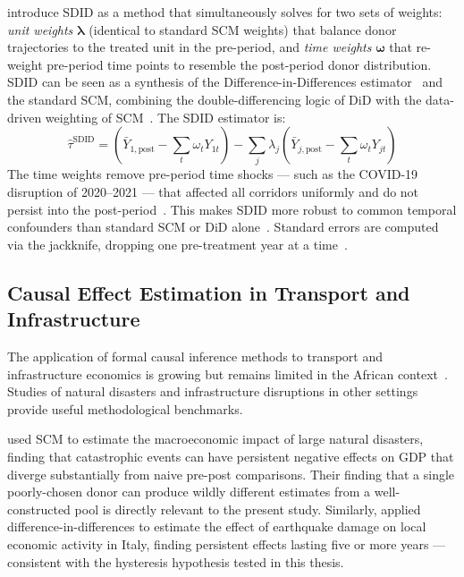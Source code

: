 \textcite{arkhangelsky2021} introduce SDID as a
method that simultaneously solves for two sets of weights:
\emph{unit weights} $\boldsymbol{\lambda}$ (identical to standard
SCM weights) that balance donor trajectories to the treated unit
in the pre-period, and \emph{time weights} $\boldsymbol{\omega}$
that re-weight pre-period time points to resemble the post-period
donor distribution.
SDID can be seen as a synthesis of the Difference-in-Differences
estimator~\parencite{card1994} and the standard SCM, combining the
double-differencing logic of DiD with the data-driven weighting of
SCM~\parencite{arkhangelsky2021}.
The SDID estimator is:
\begin{equation}
  \hat{\tau}^{\text{SDID}} =
    \left(\bar{Y}_{1,\text{post}} - \sum_t \omega_t Y_{1t}\right)
    - \sum_j \lambda_j \!\left(\bar{Y}_{j,\text{post}}
      - \sum_t \omega_t Y_{jt}\right)
  \label{eq:sdid}
\end{equation}
The time weights remove pre-period time shocks --- such as the
COVID-19 disruption of 2020--2021 --- that affected all corridors
uniformly and do not persist into the post-period~\parencite{arkhangelsky2021}.
This makes SDID more robust to common temporal confounders than
standard SCM or DiD alone~\parencite{arkhangelsky2021}.
Standard errors are computed via the jackknife, dropping one
pre-treatment year at a time~\parencite{arkhangelsky2021}.

\subsection{Causal Effect Estimation in Transport and Infrastructure}
\label{sec:transport_causal}

The application of formal causal inference methods to transport and
infrastructure economics is growing but remains limited in the
African context~\parencite{jedwab2016}.
Studies of natural disasters and infrastructure disruptions in other
settings provide useful methodological benchmarks.

\textcite{cavallo2013} used SCM to estimate the
macroeconomic impact of large natural disasters, finding that
catastrophic events can have persistent negative effects on GDP that
diverge substantially from naive pre-post comparisons.
Their finding that a single poorly-chosen donor can produce wildly
different estimates from a well-constructed pool is directly relevant
to the present study.
Similarly, \textcite{barone2014} applied difference-in-differences
to estimate the effect of earthquake damage on local economic activity
in Italy, finding persistent effects lasting five or more years ---
consistent with the hysteresis hypothesis tested in this thesis.

